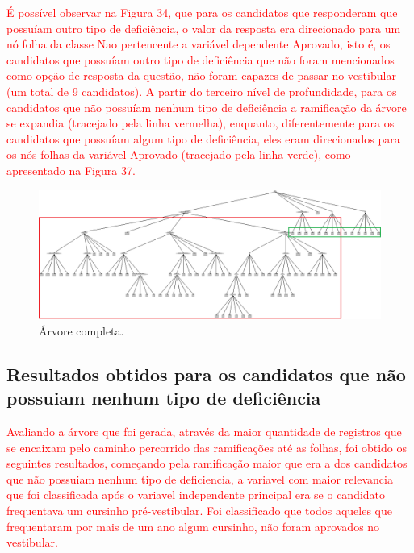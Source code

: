\par
\textcolor{red}{É possível observar na Figura 34, que para os candidatos que responderam que possuíam outro tipo de deficiência, o valor da resposta era direcionado para um nó folha da classe Nao pertencente a variável dependente Aprovado, isto é, os candidatos que possuíam outro tipo de deficiência que não foram mencionados como opção de resposta da questão, não foram capazes de passar no vestibular (um total de 9 candidatos). A partir do terceiro nível de profundidade, para os candidatos que não possuíam nenhum tipo de deficiência a ramificação da árvore se expandia (tracejado pela linha vermelha), enquanto, diferentemente para os candidatos que possuíam algum tipo de deficiência, eles eram direcionados para os nós folhas da variável Aprovado (tracejado pela linha verde), como apresentado na Figura 37.}

\par
\begin{figure}[!htp]
	\begin{center}
    \caption{\label{fig:waveform_fig} Árvore completa.}
	\includegraphics[scale=0.45]{Figuras/Arvore_completa.png}
	\end{center}
\end{figure}


\subsection{Resultados obtidos para os candidatos que não possuiam nenhum tipo de deficiência}


\par
\textcolor{red}{Avaliando a árvore que foi gerada, através da maior quantidade de registros que se encaixam pelo caminho percorrido das ramificações até as folhas, foi obtido os seguintes resultados, começando pela ramificação maior que era a dos candidatos que não possuiam nenhum tipo de deficiencia, a variavel com maior relevancia que foi classificada após o variavel independente principal era se o candidato frequentava um cursinho pré-vestibular. Foi classificado que todos aqueles que frequentaram por mais de um ano algum cursinho, não foram aprovados no vestibular.}

